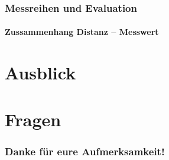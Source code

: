 \documentclass{beamer}
\begin{document}
\begin{frame}
	\frametitle{Messreihen und Evaluation}
	\framesubtitle{Zussammenhang Distanz – Messwert}
	


\end{frame}


\section{Ausblick}

\section*{Fragen}
\begin{frame}
 \frametitle{Danke für eure Aufmerksamkeit!}
\end{frame}
\end{document}

